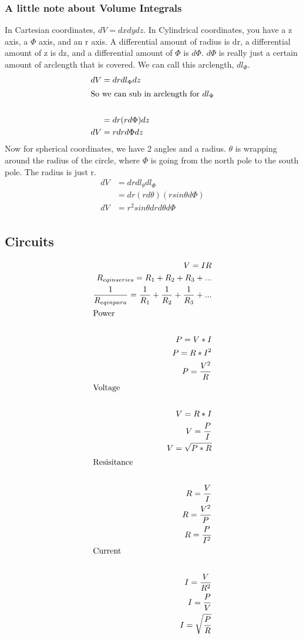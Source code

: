 \subsubsection{A little note about Volume Integrals}
In Cartesian coordinates, $dV=dxdydz$. In Cylindrical coordinates, you have a z axis, a $\Phi$ axis, and an r axis. A differential amount of radius is dr, a differential amount of z is dz, and a differential amount of $\Phi$ is $d\Phi$. $d\Phi$ is really just a certain amount of arclength that is covered. We can call this arclength, $dl_\Phi$.
\begin{align}
    dV&=drdl_\Phi dz\\
    \shortintertext{So we can sub in arclength for $dl_\Phi$}\\
    &=dr(rd\Phi)dz\\
    dV&=rdrd\Phi dz\\
\end{align}
Now for spherical coordinates, we have 2 angles and a radius. $\theta$ is wrapping around the radius of the circle, where $\Phi$ is going from the north pole to the south pole. The radius is just r.
\begin{align*}
    dV&=drdl_\theta dl_\Phi\\
    &=dr(rd\theta)(rsin\theta d\Phi)\\
    dV&=r^2sin\theta drd\theta d\Phi\\
\end{align*}
\newpage

\subsection{Circuits}
\begin{align}
    V=IR\\
    R_{eq in series}=R_1+R_2+R_3+...\\
    \frac{1}{R_{eq in para}}=\frac{1}{R_1}+\frac{1}{R_2}+\frac{1}{R_3}+...\\
    \shortintertext{Power}\\
    P=V*I\\
    P=R*I^2\\
    P=\frac{V^2}{R}\\
    \shortintertext{Voltage}\\
    V=R*I\\
    V=\frac{P}{I}\\
    V=\sqrt{P*R}\\
    \shortintertext{Resisitance}\\
    R=\frac{V}{I}\\
    R=\frac{V^2}{P}\\
    R=\frac{P}{I^2}\\
    \shortintertext{Current}\\
    I=\frac{V}{R^2}\\
    I=\frac{P}{V}\\
    I=\sqrt{\frac{P}{R}}
\end{align}
\newpage

